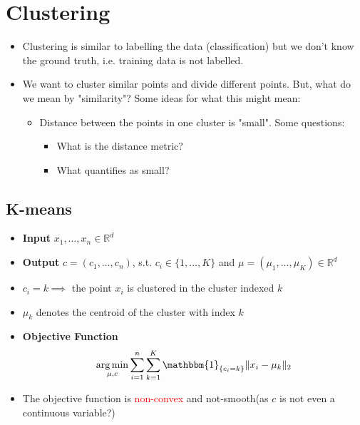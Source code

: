 \documentclass{article}
\DeclareMathOperator*{\argmin}{arg\,min}
\newcommand{\red}[1]{\textcolor{red}{#1}}
\newcommand{\hrfullline}{\noindent\makebox[\linewidth]{\rule{\paperwidth}{2pt}}}
\begin{document}
\hrfullline
\newpage

\section{Clustering}

\begin{itemize}
    \item Clustering is similar to labelling the data (classification) but we don't know the ground truth, i.e. training data is not labelled.
    \item We want to cluster similar points and divide different points. But, what do we mean by "similarity"? Some ideas for what this might mean:
        \begin{itemize}
            \item Distance between the points in one cluster is "small". Some questions:
                \begin{itemize}
                    \item What is the distance metric?
                    \item What quantifies as small?
                \end{itemize}
        \end{itemize}
\end{itemize}


\subsection{K-means}

\begin{itemize}
    \item \textbf{Input} $x_1, \dots, x_n \in \mathbb{R}^d$
    \item \textbf{Output} $c=(c_1, \dots, c_n)$, s.t. $c_i \in \{1, \dots, K\}$ and $\mu=(\mu_1, \dots, \mu_K) \in \mathbb{R}^d$
    \item $c_i=k \implies$ the point $x_i$ is clustered in the cluster indexed $k$
    \item $\mu_k$ denotes the centroid of the cluster with index $k$
    \item \textbf{Objective Function} $$\argmin_{\mu, c} \sum_{i=1}^n \sum_{k=1}^K \mathbbm{1}_{\{c_i=k\}} \Vert x_i-\mu_k \Vert_2$$
    \item The objective function is \red{non-convex} and not-smooth(as $c$ is not even a continuous variable?)
\end{itemize}
\end{document}
